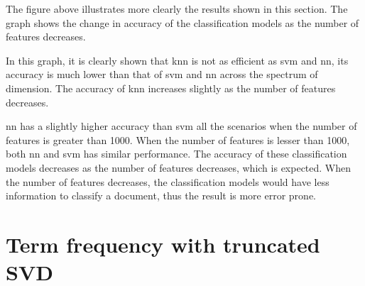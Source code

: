 The figure above illustrates more clearly the results shown in this section. The graph shows the change in accuracy of the classification models as the number of features decreases.

In this graph, it is clearly shown that \ac{knn} is not as efficient as \ac{svm} and \ac{nn}, its accuracy is much lower than that of \ac{svm} and \ac{nn} across the spectrum of dimension. The accuracy of \ac{knn} increases slightly as the number of features decreases.

\Ac{nn} has a slightly higher accuracy than \ac{svm} all the scenarios when the number of features is greater than 1000. When the number of features is lesser than 1000, both \ac{nn} and \ac{svm} has similar performance. The accuracy of these classification models decreases as the number of features decreases, which is expected. When the number of features decreases, the classification models would have less information to classify a document, thus the result is more error prone.\\

\section{Term frequency with truncated SVD}

